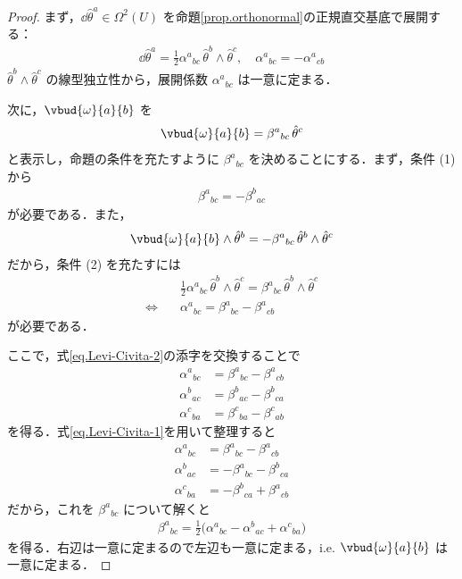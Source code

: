 \documentclass[geometry_main]{subfiles}
\begin{document}
\begin{proof} 
	まず，$\dd{\hat{\theta}^a} \in \Omega^2(U)$ を命題\ref{prop.orthonormal}の正規直交基底で展開する：
	\begin{align} 
		\dd{\hat{\theta}^a} = \frac{1}{2} \alpha^{a}{}_{bc}\, \hat{\theta}^b \wedge \hat{\theta}^c,\quad \alpha^{a}{}_{bc} = - \alpha^{a}{}_{cb}
	\end{align}
	$\hat{\theta}^b \wedge \hat{\theta}^c$ の線型独立性から，展開係数 $ \alpha^{a}{}_{bc}$ は一意に定まる．
	
	次に，$\vbud{\omega}{a}{b}$ を
	\begin{align} 
		\vbud{\omega}{a}{b} = \beta^a{}_{bc} \, \hat{\theta}^c
	\end{align}
	と表示し，命題の条件を充たすように $\beta^a{}_{bc}$ を決めることにする．まず，条件 (1) から
	\begin{align} 
		\label{eq.Levi-Civita-1}
		\beta^a{}_{bc} = - \beta^b{}_{ac}
	\end{align}
	が必要である．また，
	\begin{align} 
		\vbud{\omega}{a}{b} \wedge \hat{\theta}^b = -\beta^a{}_{bc} \, \hat{\theta}^b \wedge \hat{\theta}^c
	\end{align}
	だから，条件 (2) を充たすには
	\begin{align} 
		&\frac{1}{2} \alpha^{a}{}_{bc}\, \hat{\theta}^b \wedge \hat{\theta}^c = \beta^a{}_{bc} \, \hat{\theta}^b \wedge \hat{\theta}^c \\
		\Longleftrightarrow \quad & \alpha^{a}{}_{bc} = \beta^a{}_{bc} - \beta^a{}_{cb} \label{eq.Levi-Civita-2}
	\end{align}
	が必要である．

	ここで，式\eqref{eq.Levi-Civita-2}の添字を交換することで
	\begin{align} 
		\alpha^{a}{}_{bc} &= \beta^a{}_{bc} - \beta^a{}_{cb} \\
		\alpha^{b}{}_{ac} &= \beta^b{}_{ac} - \beta^b{}_{ca} \\
		\alpha^{c}{}_{ba} &= \beta^c{}_{ba} - \beta^c{}_{ab}
	\end{align}
	を得る．式\eqref{eq.Levi-Civita-1}を用いて整理すると
	\begin{align} 
		\alpha^{a}{}_{bc} &= \beta^a{}_{bc} - \beta^a{}_{cb} \\
		\alpha^{b}{}_{ac} &= -\beta^a{}_{bc} - \beta^b{}_{ca} \\
		\alpha^{c}{}_{ba} &= -\beta^b{}_{ca} + \beta^a{}_{cb}
	\end{align}
	だから，これを $\beta^a{}_{bc}$ について解くと
	\begin{align} 
		\beta^a{}_{bc} = \frac{1}{2} \bigl( \alpha^{a}{}_{bc} - \alpha^{b}{}_{ac} + \alpha^{c}{}_{ba}  \bigr) 
	\end{align}
	を得る．右辺は一意に定まるので左辺も一意に定まる，i.e. $\vbud{\omega}{a}{b}$ は一意に定まる．
\end{proof}
\end{document}
